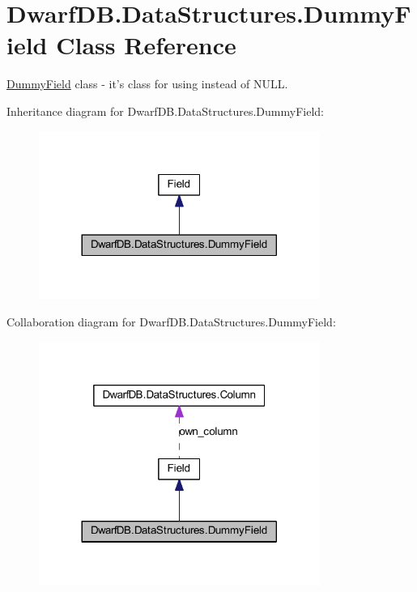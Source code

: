 \hypertarget{class_dwarf_d_b_1_1_data_structures_1_1_dummy_field}{
\section{DwarfDB.DataStructures.DummyField Class Reference}
\label{class_dwarf_d_b_1_1_data_structures_1_1_dummy_field}
}


\hyperlink{class_dwarf_d_b_1_1_data_structures_1_1_dummy_field}{DummyField} class -\/ it's class for using instead of NULL.  




Inheritance diagram for DwarfDB.DataStructures.DummyField:
\nopagebreak
\begin{figure}[H]
\begin{center}
\leavevmode
\includegraphics[width=260pt]{class_dwarf_d_b_1_1_data_structures_1_1_dummy_field__inherit__graph}
\end{center}
\end{figure}


Collaboration diagram for DwarfDB.DataStructures.DummyField:
\nopagebreak
\begin{figure}[H]
\begin{center}
\leavevmode
\includegraphics[width=260pt]{class_dwarf_d_b_1_1_data_structures_1_1_dummy_field__coll__graph}
\end{center}
\end{figure}
